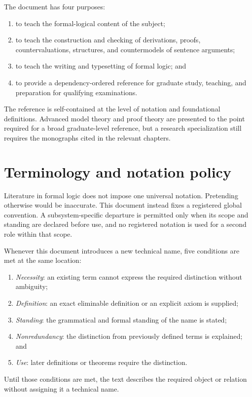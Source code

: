 \documentclass[11pt,oneside,openany]{book}
\theoremstyle{definition}
\theoremstyle{plain}
\theoremstyle{remark}
\begin{document}
The document has four purposes:
\begin{enumerate}
  \item to teach the formal-logical content of the subject;
  \item to teach the construction and checking of derivations, proofs,
        countervaluations, structures, and countermodels of sentence
        arguments;
  \item to teach the writing and typesetting of formal logic; and
  \item to provide a dependency-ordered reference for graduate study, teaching,
        and preparation for qualifying examinations.
\end{enumerate}

The reference is self-contained at the level of notation and foundational
definitions.  Advanced model theory and proof theory are presented to the
point required for a broad graduate-level reference, but a research specialization
still requires the monographs cited in the relevant chapters.

\section*{Terminology and notation policy}

Literature in formal logic does not impose one universal notation.  Pretending
otherwise would be inaccurate.  This document instead fixes a registered
global convention.  A subsystem-specific departure is permitted only when its
scope and standing are declared before use, and no registered notation is used
for a second role within that scope.

Whenever this document introduces a new technical name, five conditions are
met at the same location:
\begin{enumerate}
  \item \emph{Necessity}: an existing term cannot express the required
        distinction without ambiguity;
  \item \emph{Definition}: an exact eliminable definition or an explicit axiom
        is supplied;
  \item \emph{Standing}: the grammatical and formal standing of the
        name is stated;
  \item \emph{Nonredundancy}: the distinction from previously defined terms is
        explained; and
  \item \emph{Use}: later definitions or theorems require the distinction.
\end{enumerate}
Until those conditions are met, the text describes the required object or
relation without assigning it a technical name.
\end{document}
